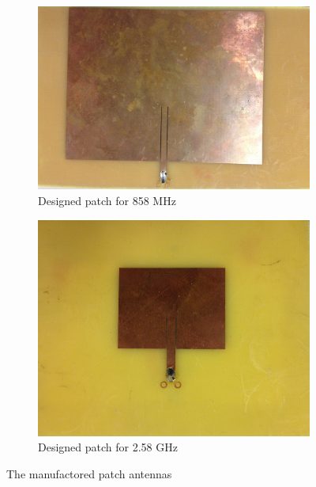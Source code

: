 \begin{figure}[H]
\captionsetup{belowskip=0em}
\begin{subfigure}[b]{0.48\textwidth}
\includegraphics[width=\textwidth]{figure/IMG_0916.jpg}
\caption{Designed patch for 858 MHz}
\label{fig:868Patch}
\end{subfigure}
\begin{subfigure}[b]{0.48\textwidth}
\includegraphics[width=\textwidth]{figure/IMG_0917.jpg}
\caption{Designed patch for 2.58 GHz}
\label{fig:2.4Patch}
\end{subfigure}
\captionsetup{belowskip=-1.5em}
\caption{The manufactored patch antennas}
\end{figure}



